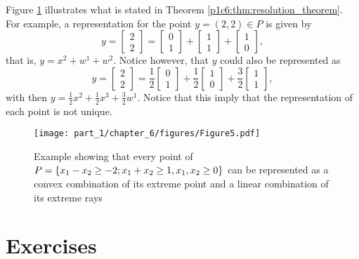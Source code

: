 Figure \ref{p1c6:fig:resolution_example} illustrates what is stated in Theorem \ref{p1c6:thm:resolution_theorem}. For example,  a representation for the point $y = (2,2) \in P$ is given by
%
\begin{equation*}
	y = \begin{bmatrix} 2 \\ 2
		\end{bmatrix}= \begin{bmatrix} 0 \\ 1
		\end{bmatrix} + \begin{bmatrix} 1 \\ 1
		\end{bmatrix} + \begin{bmatrix} 1 \\ 0
		\end{bmatrix}, 	
\end{equation*}
%
that is, $y = x^2 + w^1 + w^2$. Notice however, that $y$ could also be represented as 
%
\begin{equation*}
	y = \begin{bmatrix} 2 \\ 2
		\end{bmatrix}= \frac{1}{2}\begin{bmatrix} 0 \\ 1
		\end{bmatrix} + \frac{1}{2}\begin{bmatrix} 1 \\ 0
		\end{bmatrix} + \frac{3}{2}\begin{bmatrix} 1 \\ 1
		\end{bmatrix}, 	
\end{equation*}
%
with then $y = \frac{1}{2}x^2 + \frac{1}{2}x^3 + \frac{3}{2}w^1$. Notice that this imply that the representation of each point is not unique.

\begin{figure}[h]
	\texttt{[image: part\_1/chapter\_6/figures/Figure5.pdf]}
	\caption{Example showing that every point of $P = \left\{ x_1 - x_2 \geq -2; x_1 + x_2 \geq 1, x_1,x_2 \geq 0 \right \}$ can be represented as a convex combination of its extreme point and a linear combination of its extreme rays} \label{p1c6:fig:resolution_example}
\end{figure}

\pagebreak	

\section{Exercises}

